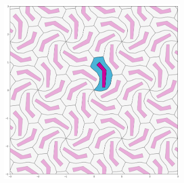 \documentclass[12pt]{article}
\begin{document}
\begin{figure}[H]
\begin{subfigure}[b]{0.32\textwidth}
    \label{fig:f8}
  \end{subfigure}
  \begin{subfigure}[b]{0.32\textwidth}
    \includegraphics[width=.9\textwidth]{poligon3.png}
    \label{fig:f9}
  \end{subfigure}
\end{figure}
\end{document}
